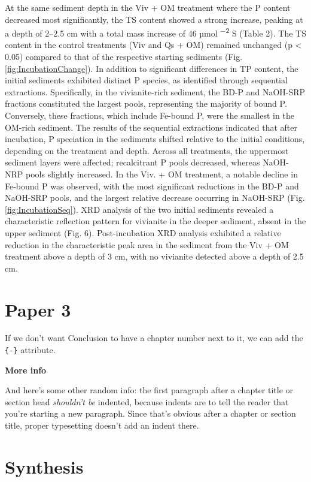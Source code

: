\documentclass[12pt,twoside]{book}
\begin{document}
At the same sediment depth in the Viv + OM treatment where the P content decreased most significantly, the TS content showed a strong increase, peaking at a depth of 2--2.5 cm with a total mass increase of 46 µmol \textsuperscript{−2} S (Table 2). The TS content in the control treatments (Viv and Qs + OM) remained unchanged (p \textless{} 0.05) compared to that of the respective starting sediments (Fig. \ref{fig:IncubationChange}).
In addition to significant differences in TP content, the initial sediments exhibited distinct P species, as identified through sequential extractions. Specifically, in the vivianite-rich sediment, the BD-P and NaOH-SRP fractions constituted the largest pools, representing the majority of bound P. Conversely, these fractions, which include Fe-bound P, were the smallest in the OM-rich sediment.
The results of the sequential extractions indicated that after incubation, P speciation in the sediments shifted relative to the initial conditions, depending on the treatment and depth. Across all treatments, the uppermost sediment layers were affected; recalcitrant P pools decreased, whereas NaOH-NRP pools slightly increased. In the Viv. + OM treatment, a notable decline in Fe-bound P was observed, with the most significant reductions in the BD-P and NaOH-SRP pools, and the largest relative decrease occurring in NaOH-SRP (Fig. \ref{fig:IncubationSeq}).
XRD analysis of the two initial sediments revealed a characteristic reflection pattern for vivianite in the deeper sediment, absent in the upper sediment (Fig. 6). Post-incubation XRD analysis exhibited a relative reduction in the characteristic peak area in the sediment from the Viv + OM treatment above a depth of 3 cm, with no vivianite detected above a depth of 2.5 cm.

\chapter{Paper 3}\label{paper3}

If we don't want Conclusion to have a chapter number next to it, we can add the \texttt{\{-\}} attribute.

\textbf{More info}

And here's some other random info: the first paragraph after a chapter title or section head \emph{shouldn't be} indented, because indents are to tell the reader that you're starting a new paragraph. Since that's obvious after a chapter or section title, proper typesetting doesn't add an indent there.

\chapter{Synthesis}\label{synthesis}
\end{document}
